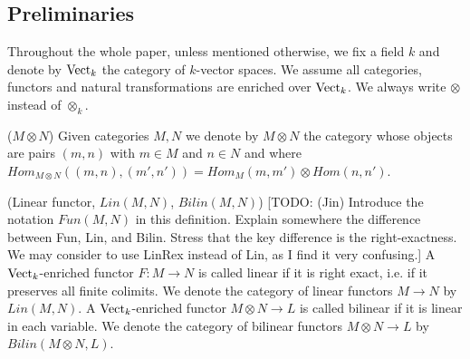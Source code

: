 


\subsection{Preliminaries}\label{subsection/preliminaries}

Throughout the whole paper, unless mentioned otherwise, we fix a field $k$ and denote by $\operatorname{Vect}_k$ the category of $k$-vector spaces. We assume all categories, functors and natural transformations are enriched over $\operatorname{Vect}_k$. We always write $\otimes$ instead of $\otimes_k$.

\begin{definition} ($M \otimes N$)
Given categories $M,N$ we denote by $M\otimes N$ the category whose objects are pairs $(m,n)$ with $m\in M$ and $n\in N$ and where $Hom_{M\otimes N}((m,n),(m',n'))=Hom_M(m,m')\otimes Hom(n,n')$.
\end{definition}


\begin{definition} (Linear functor, $Lin(M,N)$, $Bilin(M,N)$)
  [TODO: (Jin) Introduce the notation $Fun(M,N)$ in this definition. Explain somewhere the difference between Fun, Lin, and Bilin. Stress that the key difference is the right-exactness. We may consider to use LinRex instead of Lin, as I find it very confusing.]
  A $\operatorname{Vect}_k$-enriched functor $F:M\to N$ is called linear if it is right
  exact, i.e. if it preserves all finite colimits. We denote the category of
  linear functors $M\to N$ by $Lin(M,N)$. A $\operatorname{Vect}_k$-enriched functor
  $M\otimes N \to L$ is called bilinear if it is linear in each variable. We
  denote the category of bilinear functors $M\otimes N \to L$ by
  $Bilin(M\otimes N, L)$.
\end{definition}

